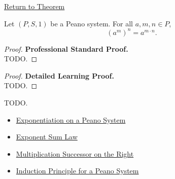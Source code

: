 \newpage
{}
\label{prf:exponent-power-law}

\begin{remark*}[Return]
\hyperref[thm:exponent-power-law]{Return to Theorem}
\end{remark*}

\begin{theorem*}
Let $(P,S,1)$ be a Peano system. For all $a,m,n \in P$,
\[
(a^m)^n = a^{m \cdot n}.
\]
\end{theorem*}

\begin{proof}
\textbf{Professional Standard Proof.}~\\
TODO.
\end{proof}

\begin{proof}
\textbf{Detailed Learning Proof.}~\\
TODO.
\end{proof}

\begin{remark*}
TODO.
\end{remark*}

\begin{dependencies}
\begin{itemize}
  \item \hyperref[def:exponentiation-on-peano-system]{Exponentiation on a Peano System}
  \item \hyperref[thm:exponent-sum-law]{Exponent Sum Law}
  \item \hyperref[thm:multiplication-successor-on-right]{Multiplication Successor on the Right}
  \item \hyperref[thm:induction-principle-for-peano-system]{Induction Principle for a Peano System}
\end{itemize}
\end{dependencies}
